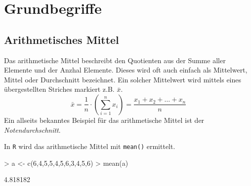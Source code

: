 



\chapter{Grundbegriffe}
\newpage

\section{Arithmetisches Mittel}
Das \gls{arithmetische Mittel} beschreibt den Quotienten aus 
der Summe aller Elemente und der Anzhal Elemente. Dieses wird oft auch
einfach als Mittelwert, \gls{Mittel} oder \gls{Durchschnitt} bezeichnet. 
Ein solcher Mittelwert wird mittels eines übergestellten Striches 
markiert z.B.
$\bar{x}$.
\[ 
	\bar{x} 
	= \frac{1}{n} \cdot \left( \sum_{i=1}^{n} x_i \right)
	= \frac{x_1 + x_2 + \dots + x_n}{n}
\]
Ein allseits bekanntes Beispiel für das arithmetische Mittel ist der 
\emph{Notendurchschnitt}. 

In \lstinline{R} wird das arithmetische Mittel mit 
\lstinline{mean()} ermittelt.
\begin{Schunk}
\begin{Sinput}
> a <- c(6,4,5,5,4,5,6,3,4,5,6)
> mean(a)
\end{Sinput}
\begin{Soutput}
[1] 4.818182
\end{Soutput}
\end{Schunk}

